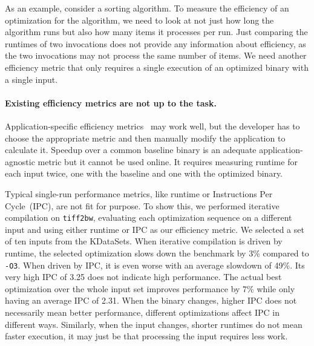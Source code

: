     As an example, consider a sorting algorithm. To measure the efficiency of an optimization for the algorithm, we need to look at not just
    how long the algorithm runs but also how many items it processes per run. Just comparing the runtimes of two invocations does not
    provide any information about efficiency, as the two invocations may not process the same number of items. We need another efficiency metric
    that only requires a single execution of an optimized binary with a single input.

    \paragraph{Existing efficiency metrics are not up to the task.} Application-specific efficiency metrics~\cite{alameldeen06,coppa14} may
    work well, but the developer has to choose the appropriate metric and then manually modify the application to calculate it. Speedup
    over a common baseline binary is an adequate application-agnostic metric but it cannot be used online. It requires measuring runtime
    for each input twice, one with the baseline and one with the optimized binary.

    Typical single-run performance metrics, like runtime or Instructions Per Cycle~(IPC), are not fit for purpose. To show this, we
    performed iterative compilation on \texttt{tiff2bw}, evaluating each optimization sequence on a different input and using either
    runtime or IPC as our efficiency metric. We selected a set of ten inputs from the KDataSets. When
    iterative compilation is driven by runtime, the selected optimization slows down the benchmark by 3\% compared to \texttt{-O3}. When
    driven by IPC, it is even worse with an average slowdown of 49\%. Its very high IPC of 3.25 does not indicate high performance. The
    actual best optimization over the whole input set improves performance by 7\% while only having an average IPC of 2.31.
    When the binary changes, higher IPC does not necessarily mean better performance, different optimizations affect IPC in different ways.
    Similarly, when the input changes, shorter runtimes do not mean faster execution, it may just be that processing the input requires less work. 

